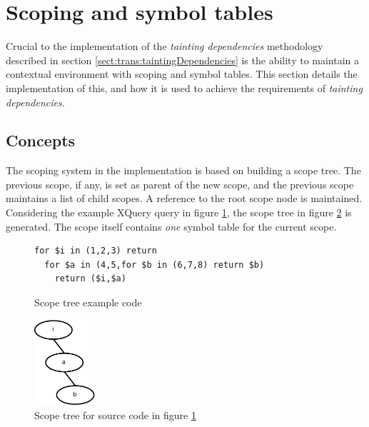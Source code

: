 \section{Scoping and symbol tables}
Crucial to the implementation of the \textit{tainting dependencies} methodology
described in section \ref{sect:trans:taintingDependencies} is the ability to
maintain a contextual environment with scoping and symbol tables. This section
details the implementation of this, and how it is used to achieve the
requirements of \textit{tainting dependencies}.

\subsection{Concepts}
The scoping system in the implementation is based on building a scope tree. The
previous scope, if any, is set as parent of the new scope, and the previous
scope maintains a list of child scopes. A reference to the root scope node is
maintained. Considering the example XQuery query in figure
\ref{fig:impl:scope_tree_ex_code}, the scope tree in figure
\ref{fig:impl:scope_tree_ex} is generated. The scope itself contains \emph{one}
symbol table for the current scope.

\begin{figure}[!htp]
\begin{center}
\begin{Verbatim}
for $i in (1,2,3) return 
  for $a in (4,5,for $b in (6,7,8) return $b) 
    return ($i,$a)
\end{Verbatim}
  \caption{Scope tree example code}
  \label{fig:impl:scope_tree_ex_code}
\end{center}
\end{figure}

\begin{figure}[!htp]
\begin{center}
  \includegraphics[width=0.2\textwidth]{diagrams/scope_tree_ex}
  \caption{Scope tree for source code in figure
  \ref{fig:impl:scope_tree_ex_code}} 
  \label{fig:impl:scope_tree_ex}
\end{center}
\end{figure}

